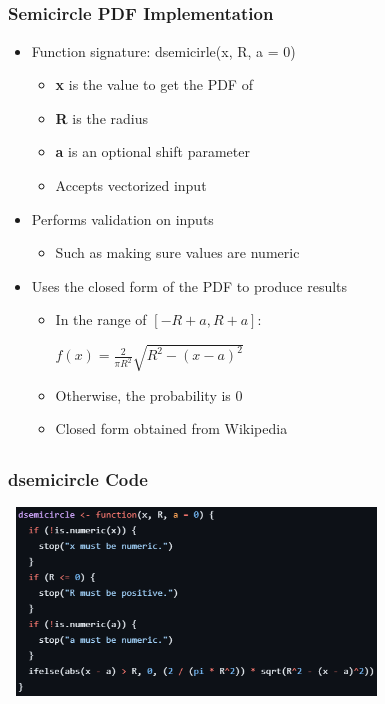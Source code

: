 \documentclass[handout, xcolor=dvipsnames]{beamer}
\begin{document}
\subsection{}
\begin{frame}
	\frametitle{Semicircle PDF Implementation}
        \begin{itemize}
            \item Function signature: dsemicirle(x, R, a = 0)
            \begin{itemize}
                \item \textbf{x} is the value to get the PDF of
                \item \textbf{R} is the radius
                \item \textbf{a} is an optional shift parameter
                \item Accepts vectorized input
            \end{itemize}
            \item Performs validation on inputs
            \begin{itemize}
                \item Such as making sure values are numeric
            \end{itemize}
            \item Uses the closed form of the PDF to produce results
            \begin{itemize}
                \item In the range of $[-R+a, R+a]$:
                \begin{center}
                    $f(x)=\frac{2}{\pi R^2}\sqrt{R^2-(x-a)^2}$
                \end{center}
                \item Otherwise, the probability is 0
                \item Closed form obtained from Wikipedia
            \end{itemize}
        \end{itemize}
\end{frame}


\subsection{}
\begin{frame}
	\frametitle{dsemicircle Code}
        \begin{center}
            \includegraphics[width=10cm,height=5cm]{Figures/dsemi_code.png}
        \end{center}
\end{frame}
\end{document}
